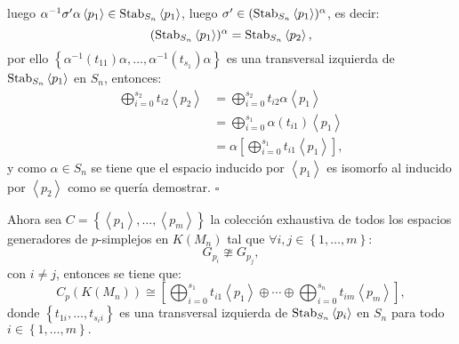 \documentclass[12pt]{book}
\theoremstyle{definition}
\newcounter{in}
\begin{document}
luego $\alpha^{-1} \sigma' \alpha  \left \langle p_{1} \right \rangle \in \textup{Stab}_{S_{n}}  \left \langle p_{1} \right \rangle$, luego $\sigma' \in (\textup{Stab}_{S_{n}}  \left \langle p_{1} \right \rangle)^{\alpha}$, es decir:
$$(\textup{Stab}_{S_{n}}  \left \langle p_{1} \right \rangle)^{\alpha} = \textup{Stab}_{S_{n}}  \left \langle p_{2} \right \rangle,$$
por ello $\left \{ \alpha^{-1} (t_{11}) \alpha,\ldots, \alpha^{-1} (t_{s_{1}}) \alpha \right \}$ es una transversal izquierda de $\textup{Stab}_{S_{n}}  \left \langle p_{1} \right \rangle$ en $S_{n}$, entonces:
\begin{equation*}
\begin{aligned}
\bigoplus_{i=0}^{s_{2}} t_{i2} \left \langle p_{2} \right \rangle & = \bigoplus_{i=0}^{s_{2}} t_{i2} \alpha  \left \langle p_{1} \right \rangle \\
& = \bigoplus_{i=0}^{s_{1}} \alpha (t_{i1})  \left \langle p_{1} \right \rangle \\
& = \alpha \left [ \bigoplus_{i=0}^{s_{1}} t_{i1} \left \langle p_{1} \right \rangle \right ],
\end{aligned}
\end{equation*}
y como $\alpha \in S_{n}$ se tiene que el espacio inducido por $\left \langle p_{1} \right \rangle$ es isomorfo al inducido por $ \left \langle p_{2} \right \rangle$ como se quería demostrar. $\square$

Ahora sea $C = \left \{ \left \langle p_{1} \right \rangle,\ldots, \left \langle p_{m} \right \rangle \right \}$ la colección exhaustiva de todos los espacios generadores de $p$-simplejos en $K(M_{n})$ tal que $\forall i,j \in \left \{ 1,\ldots,m \right \}$:
$$G_{p_{i}} \ncong G_{p_{j}},$$
con $i \neq j$, entonces se tiene que:
$$C_{p}(K(M_{n})) \cong \left [ \bigoplus_{i=0}^{s_{1}} t_{i1} \left \langle p_{1} \right \rangle \oplus \cdots \oplus \bigoplus_{i=0}^{s_{n}} t_{im} \left \langle p_{m} \right \rangle \right ],$$
donde $\left \{ t_{1i}, \ldots, t_{s_{i}i} \right \}$ es una transversal izquierda de $\textup{Stab}_{S_{n}}  \left \langle p_{i} \right \rangle$ en $S_{n}$ para todo $i \in \left \{ 1,\ldots,m \right \}.$
\end{document}
